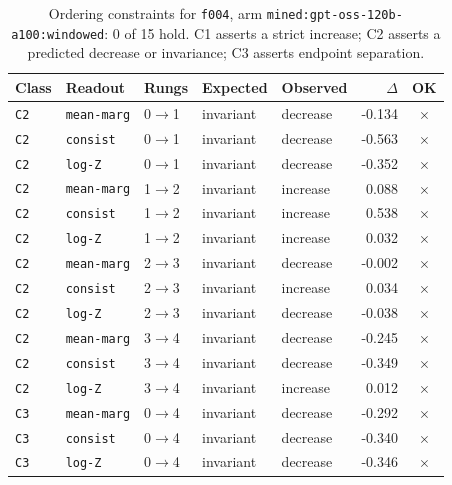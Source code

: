\documentclass[11pt]{article}
\begin{document}
\begin{table}[htbp]
\centering
\small
\caption{Ordering constraints for \texttt{f004}, arm \texttt{mined:gpt-oss-120b-a100:windowed}: 0 of 15 hold. C1 asserts a strict increase; C2 asserts a predicted decrease or invariance; C3 asserts endpoint separation.}
\label{tab:ladder-f004-mined-gpt-oss-120b-a100-windowed}
\begin{tabular}{lllllrc}
\toprule
Class & Readout & Rungs & Expected & Observed & $\Delta$ & OK \\
\midrule
\texttt{C2} & \texttt{mean-marg} & 0$\to$1 & invariant & decrease & -0.134 & $\times$ \\
\texttt{C2} & \texttt{consist} & 0$\to$1 & invariant & decrease & -0.563 & $\times$ \\
\texttt{C2} & \texttt{log-Z} & 0$\to$1 & invariant & decrease & -0.352 & $\times$ \\
\texttt{C2} & \texttt{mean-marg} & 1$\to$2 & invariant & increase & 0.088 & $\times$ \\
\texttt{C2} & \texttt{consist} & 1$\to$2 & invariant & increase & 0.538 & $\times$ \\
\texttt{C2} & \texttt{log-Z} & 1$\to$2 & invariant & increase & 0.032 & $\times$ \\
\texttt{C2} & \texttt{mean-marg} & 2$\to$3 & invariant & decrease & -0.002 & $\times$ \\
\texttt{C2} & \texttt{consist} & 2$\to$3 & invariant & increase & 0.034 & $\times$ \\
\texttt{C2} & \texttt{log-Z} & 2$\to$3 & invariant & decrease & -0.038 & $\times$ \\
\texttt{C2} & \texttt{mean-marg} & 3$\to$4 & invariant & decrease & -0.245 & $\times$ \\
\texttt{C2} & \texttt{consist} & 3$\to$4 & invariant & decrease & -0.349 & $\times$ \\
\texttt{C2} & \texttt{log-Z} & 3$\to$4 & invariant & increase & 0.012 & $\times$ \\
\texttt{C3} & \texttt{mean-marg} & 0$\to$4 & invariant & decrease & -0.292 & $\times$ \\
\texttt{C3} & \texttt{consist} & 0$\to$4 & invariant & decrease & -0.340 & $\times$ \\
\texttt{C3} & \texttt{log-Z} & 0$\to$4 & invariant & decrease & -0.346 & $\times$ \\
\bottomrule
\end{tabular}
\end{table}
\end{document}
